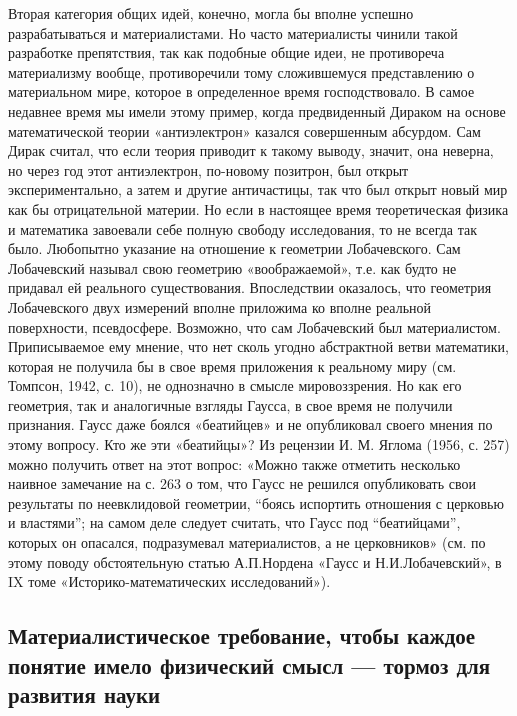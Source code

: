 Вторая категория общих идей, конечно, могла бы вполне успешно
разрабатываться и материалистами. Но часто материалисты чинили такой
разработке препятствия, так как подобные общие идеи, не противореча
материализму вообще, противоречили тому сложившемуся представлению о
материальном мире, которое в определенное время господствовало. В
самое недавнее время мы имели этому пример, когда предвиденный Дираком
на основе математической теории «антиэлектрон» казался совершенным
абсурдом. Сам Дирак считал, что если теория приводит к такому выводу,
значит, она неверна, но через год этот антиэлектрон, по-новому
позитрон, был открыт экспериментально, а затем и другие античастицы,
так что был открыт новый мир как бы отрицательной материи. Но если в
настоящее время теоретическая физика и математика завоевали себе
полную свободу исследования, то не всегда так было. Любопытно указание
на отношение к геометрии Лобачевского. Сам Лобачевский называл свою
геометрию «воображаемой», т.е. как будто не придавал ей реального
существования. Впоследствии оказалось, что геометрия Лобачевского двух
измерений вполне приложима ко вполне реальной поверхности,
псевдосфере. Возможно, что сам Лобачевский был материалистом.
Приписываемое ему мнение, что нет сколь угодно абстрактной ветви
математики, которая не получила бы в свое время приложения к реальному
миру (см. Томпсон, 1942, с. 10), не однозначно в смысле мировоззрения.
Но как его геометрия, так и аналогичные взгляды Гаусса, в свое время
не получили признания. Гаусс даже боялся «беатийцев» и не опубликовал
своего мнения по этому вопросу. Кто же эти «беатийцы»? Из рецензии И.
М. Яглома (1956, с. 257) можно получить ответ на этот вопрос: «Можно
также отметить несколько наивное замечание на с. 263 о том, что Гаусс
не решился опубликовать свои результаты по неевклидовой геометрии,
``боясь испортить отношения с церковью и властями''; на самом деле
следует считать, что Гаусс под ``беатийцами'', которых он опасался,
подразумевал материалистов, а не церковников» (см. по этому поводу
обстоятельную статью А.П.Нордена «Гаусс и Н.И.Лобачевский», в IX томе
«Историко-математических исследований»).

\subsection{Материалистическое требование, чтобы каждое понятие имело
физический смысл --- тормоз для развития науки}

